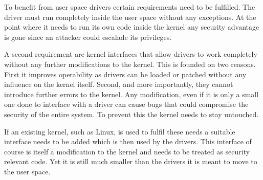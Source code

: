\documentclass[
a4paper,
12pt,
notitlepage,
parskip=half,
DIV=11,
]{scrbook}
\begin{document}
		To benefit from user space drivers certain requirements need to be fulfilled.
		The driver must run completely inside the user space without any exceptions.
		At the point where it needs to run its own code inside the kernel any security advantage is gone since an attacker could escalade its privileges.
		
		A second requirement are kernel interfaces that allow drivers to work completely without any further modifications to the kernel.
		This is founded on two reasons.
		First it improves operability as drivers can be loaded or patched without any influence on the kernel itself.
		Second, and more importantly, they cannot introduce further errors to the kernel.
		Any modification, even if it is only a small one done to interface with a driver can cause bugs that could compromise the security of the entire system.
		To prevent this the kernel needs to stay untouched.
		
		If an existing kernel, such as Linux, is used to fulfil these needs a suitable interface needs to be added which is then used by the drivers.
		This interface of course is itself a modification to the kernel and needs to be treated as security relevant code.
		Yet it is still much smaller than the drivers it is meant to move to the user space.
		
		
\end{document}
